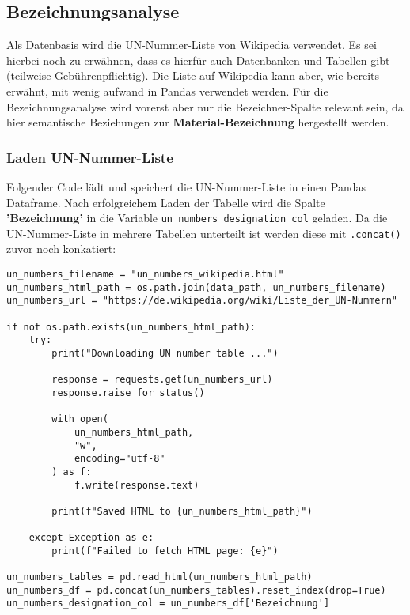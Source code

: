 \newpage

\subsection{Bezeichnungsanalyse}

Als Datenbasis wird die UN-Nummer-Liste von Wikipedia verwendet. Es sei hierbei
noch zu erwähnen, dass es hierfür auch Datenbanken und Tabellen gibt
(teilweise Gebührenpflichtig). Die Liste auf Wikipedia kann aber, wie bereits 
erwähnt, mit wenig aufwand in Pandas verwendet werden. Für die
Bezeichnungsanalyse wird vorerst aber nur die Bezeichner-Spalte relevant sein,
da hier semantische Beziehungen zur \textbf{Material-Bezeichnung} hergestellt
werden.\\

\subsubsection{Laden UN-Nummer-Liste}

Folgender Code lädt und speichert die UN-Nummer-Liste in einen Pandas Dataframe.
Nach erfolgreichem Laden der Tabelle wird die Spalte \textbf{'Bezeichnung'} in
die Variable \texttt{un\_numbers\_designation\_col} geladen. Da die 
UN-Nummer-Liste in mehrere Tabellen unterteilt ist werden diese mit
\texttt{.concat()} zuvor noch konkatiert:\\

\begin{lstlisting}
un_numbers_filename = "un_numbers_wikipedia.html"
un_numbers_html_path = os.path.join(data_path, un_numbers_filename)
un_numbers_url = "https://de.wikipedia.org/wiki/Liste_der_UN-Nummern"

if not os.path.exists(un_numbers_html_path):
    try:
        print("Downloading UN number table ...")

        response = requests.get(un_numbers_url)
        response.raise_for_status()

        with open(
            un_numbers_html_path,
            "w",
            encoding="utf-8"
        ) as f:
            f.write(response.text)

        print(f"Saved HTML to {un_numbers_html_path}")

    except Exception as e:
        print(f"Failed to fetch HTML page: {e}")

un_numbers_tables = pd.read_html(un_numbers_html_path)
un_numbers_df = pd.concat(un_numbers_tables).reset_index(drop=True)
un_numbers_designation_col = un_numbers_df['Bezeichnung']
\end{lstlisting}

